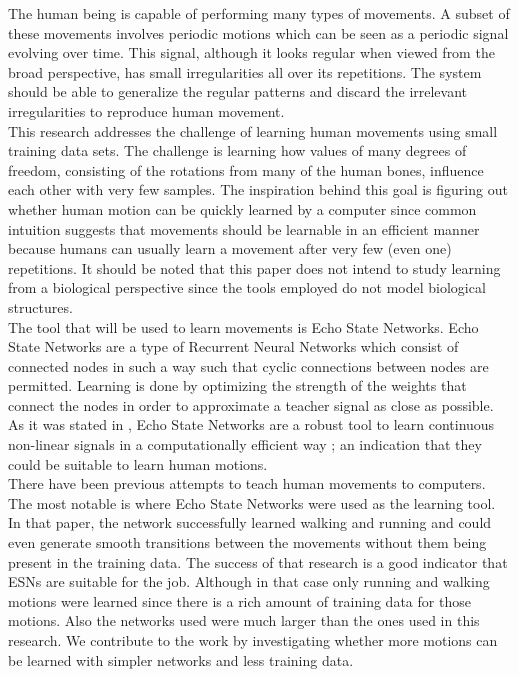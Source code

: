\documentclass[letterpaper,9pt]{article}
\begin{document}
The human being is capable of performing many types of movements. A subset of these movements involves periodic motions which can be seen as a periodic signal evolving over time. This signal, although it looks regular when viewed from the broad perspective, has small irregularities all over its repetitions. The system should be able to generalize the regular patterns and discard the irrelevant irregularities to reproduce human movement.\\

This research addresses the challenge of learning human movements using small training data sets. The challenge is learning how values of many degrees of freedom, consisting of the rotations from many of the human bones, influence each other with very few samples. The inspiration behind this goal is figuring out whether human motion can be quickly learned by a computer since common intuition suggests that movements should be learnable in an efficient manner because humans can usually learn a movement after very few (even one) repetitions. It should be noted that this paper does not intend to study learning from a biological perspective since the tools employed do not model biological structures.\\

The tool that will be used to learn movements is Echo State Networks. Echo State Networks are a type of Recurrent Neural Networks which consist of connected nodes in such a way such that cyclic connections between nodes are permitted. Learning is done by optimizing the strength of the weights that connect the nodes in order to approximate a teacher signal as close as possible. As it was stated in \cite{JaegerESNTutorial}, Echo State Networks are a robust tool to learn continuous non-linear signals in a computationally efficient way \cite{Jaeger05TrainingRRN}; an indication that they could be suitable to learn human motions.\\

There have been previous attempts to teach human movements to computers. The most notable is \cite{GentHumanMotion} where Echo State Networks were used as the learning tool. In that paper, the network successfully learned walking and running and could even generate smooth transitions between the movements without them being present in the training data. The success of that research is a good indicator that ESNs are suitable for the job. Although in that case only running and walking motions were learned since there is a rich amount of training data for those motions. Also the networks used were much larger than the ones used in this research. We contribute to the work by investigating whether more motions can be learned with simpler networks and less training data. \\
\end{document}
